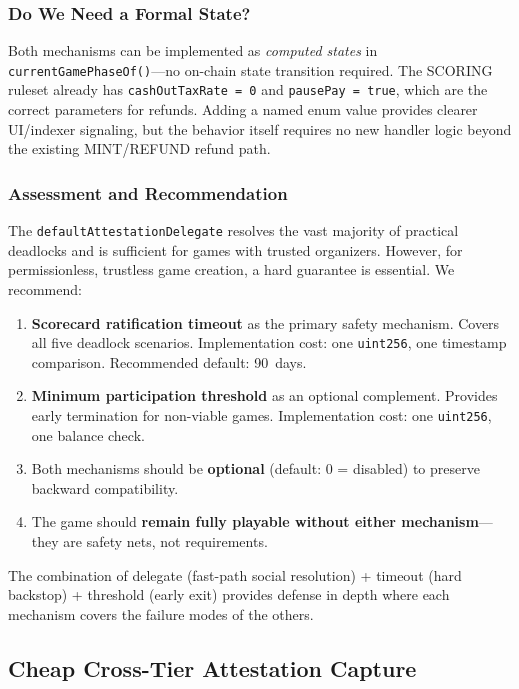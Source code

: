 \documentclass[11pt,a4paper]{article}
\begin{document}
\subsubsection{Do We Need a Formal State?}

Both mechanisms can be implemented as \emph{computed states} in \texttt{currentGamePhaseOf()}---no on-chain state transition required. The SCORING ruleset already has \texttt{cashOutTaxRate = 0} and \texttt{pausePay = true}, which are the correct parameters for refunds. Adding a named enum value provides clearer UI/indexer signaling, but the behavior itself requires no new handler logic beyond the existing MINT/REFUND refund path.

\subsubsection{Assessment and Recommendation}

The \texttt{defaultAttestationDelegate} resolves the vast majority of practical deadlocks and is sufficient for games with trusted organizers. However, for permissionless, trustless game creation, a hard guarantee is essential. We recommend:

\begin{enumerate}[nosep]
\item \textbf{Scorecard ratification timeout} as the primary safety mechanism. Covers all five deadlock scenarios. Implementation cost: one \texttt{uint256}, one timestamp comparison. Recommended default: 90~days.
\item \textbf{Minimum participation threshold} as an optional complement. Provides early termination for non-viable games. Implementation cost: one \texttt{uint256}, one balance check.
\item Both mechanisms should be \textbf{optional} (default: 0 = disabled) to preserve backward compatibility.
\item The game should \textbf{remain fully playable without either mechanism}---they are safety nets, not requirements.
\end{enumerate}

The combination of delegate (fast-path social resolution) + timeout (hard backstop) + threshold (early exit) provides defense in depth where each mechanism covers the failure modes of the others.

\subsection{Cheap Cross-Tier Attestation Capture}
\end{document}
